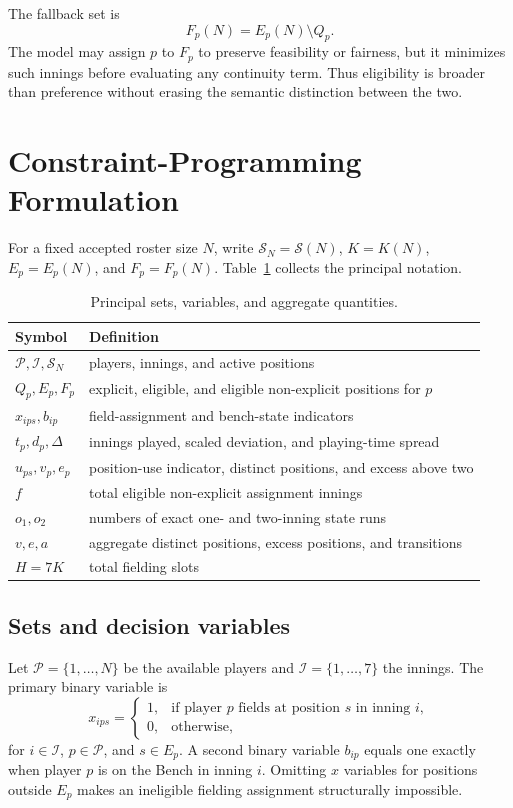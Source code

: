 \documentclass[11pt]{article}
\begin{document}
The fallback set is
\[
F_p(N)=E_p(N)\setminus Q_p.
\]
The model may assign $p$ to $F_p$ to preserve feasibility or fairness, but it
minimizes such innings before evaluating any continuity term. Thus eligibility
is broader than preference without erasing the semantic distinction between
the two.

\section{Constraint-Programming Formulation}

For a fixed accepted roster size $N$, write $\mathcal S_N=\mathcal S(N)$,
$K=K(N)$, $E_p=E_p(N)$, and $F_p=F_p(N)$. Table~\ref{tab:notation}
collects the principal notation.

\begin{table}[htbp]
\centering
\caption{Principal sets, variables, and aggregate quantities.}
\label{tab:notation}
\small
\begin{tabular}{ll}
\toprule
Symbol & Definition\\
\midrule
$\mathcal P,\mathcal I,\mathcal S_N$ & players, innings, and active positions\\
$Q_p,E_p,F_p$ & explicit, eligible, and eligible non-explicit positions for $p$\\
$x_{ips},b_{ip}$ & field-assignment and bench-state indicators\\
$t_p,d_p,\Delta$ & innings played, scaled deviation, and playing-time spread\\
$u_{ps},v_p,e_p$ & position-use indicator, distinct positions, and excess above two\\
$f$ & total eligible non-explicit assignment innings\\
$o_1,o_2$ & numbers of exact one- and two-inning state runs\\
$v,e,a$ & aggregate distinct positions, excess positions, and transitions\\
$H=7K$ & total fielding slots\\
\bottomrule
\end{tabular}
\end{table}

\subsection{Sets and decision variables}

Let $\mathcal{P}=\{1,\ldots,N\}$ be the available players and
$\mathcal{I}=\{1,\ldots,7\}$ the innings. The primary binary variable is
\[
x_{ips}=
\begin{cases}
1,&\text{if player $p$ fields at position $s$ in inning $i$},\\
0,&\text{otherwise,}
\end{cases}
\]
for $i\in\mathcal{I}$, $p\in\mathcal{P}$, and $s\in E_p$. A second binary
variable $b_{ip}$ equals one exactly when player $p$ is on the Bench in inning
$i$. Omitting $x$ variables for positions outside $E_p$ makes an ineligible
fielding assignment structurally impossible.
\end{document}
